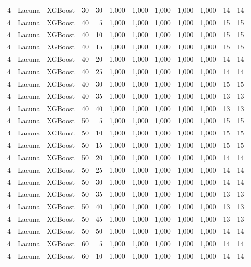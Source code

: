 \begin{longtable}{@{}rllrrrrrrrrr@{}}
4 & Lacuna & XGBoost & 30 & 30 & 1,000 & 1,000 & 1,000 & 1,000 & 1,000 & 14 & 14 \\
4 & Lacuna & XGBoost & 40 & 5 & 1,000 & 1,000 & 1,000 & 1,000 & 1,000 & 15 & 15 \\
4 & Lacuna & XGBoost & 40 & 10 & 1,000 & 1,000 & 1,000 & 1,000 & 1,000 & 15 & 15 \\
4 & Lacuna & XGBoost & 40 & 15 & 1,000 & 1,000 & 1,000 & 1,000 & 1,000 & 15 & 15 \\
4 & Lacuna & XGBoost & 40 & 20 & 1,000 & 1,000 & 1,000 & 1,000 & 1,000 & 14 & 14 \\
4 & Lacuna & XGBoost & 40 & 25 & 1,000 & 1,000 & 1,000 & 1,000 & 1,000 & 14 & 14 \\
4 & Lacuna & XGBoost & 40 & 30 & 1,000 & 1,000 & 1,000 & 1,000 & 1,000 & 15 & 15 \\
4 & Lacuna & XGBoost & 40 & 35 & 1,000 & 1,000 & 1,000 & 1,000 & 1,000 & 13 & 13 \\
4 & Lacuna & XGBoost & 40 & 40 & 1,000 & 1,000 & 1,000 & 1,000 & 1,000 & 13 & 13 \\
4 & Lacuna & XGBoost & 50 & 5 & 1,000 & 1,000 & 1,000 & 1,000 & 1,000 & 15 & 15 \\
4 & Lacuna & XGBoost & 50 & 10 & 1,000 & 1,000 & 1,000 & 1,000 & 1,000 & 15 & 15 \\
4 & Lacuna & XGBoost & 50 & 15 & 1,000 & 1,000 & 1,000 & 1,000 & 1,000 & 15 & 15 \\
4 & Lacuna & XGBoost & 50 & 20 & 1,000 & 1,000 & 1,000 & 1,000 & 1,000 & 14 & 14 \\
4 & Lacuna & XGBoost & 50 & 25 & 1,000 & 1,000 & 1,000 & 1,000 & 1,000 & 14 & 14 \\
4 & Lacuna & XGBoost & 50 & 30 & 1,000 & 1,000 & 1,000 & 1,000 & 1,000 & 14 & 14 \\
4 & Lacuna & XGBoost & 50 & 35 & 1,000 & 1,000 & 1,000 & 1,000 & 1,000 & 13 & 13 \\
4 & Lacuna & XGBoost & 50 & 40 & 1,000 & 1,000 & 1,000 & 1,000 & 1,000 & 13 & 13 \\
4 & Lacuna & XGBoost & 50 & 45 & 1,000 & 1,000 & 1,000 & 1,000 & 1,000 & 13 & 13 \\
4 & Lacuna & XGBoost & 50 & 50 & 1,000 & 1,000 & 1,000 & 1,000 & 1,000 & 14 & 14 \\
4 & Lacuna & XGBoost & 60 & 5 & 1,000 & 1,000 & 1,000 & 1,000 & 1,000 & 14 & 14 \\
4 & Lacuna & XGBoost & 60 & 10 & 1,000 & 1,000 & 1,000 & 1,000 & 1,000 & 14 & 14 \\

\end{longtable}
